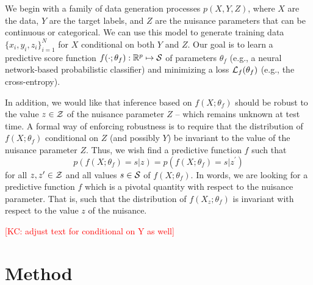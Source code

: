 \documentclass[twocolumn,superscriptaddress,aps]{revtex4-1}
\newcommand{\kcnote}[1]{\textcolor{red}{[KC: #1]}}
\theoremstyle{plain}
\begin{document}
We begin with a family of data generation processes $p(X,Y,Z)$, where $X$ are
the data, $Y$ are the target labels, and $Z$ are the nuisance parameters that
can be continuous or categorical. We can use this model to generate training
data $\{x_i, y_i, z_i\}_{i=1}^N$ for $X$ conditional on both $Y$ and $Z$. Our goal is to learn a predictive
score function $f(\cdot;\theta_f) : \mathbb{R}^p \mapsto {\cal S}$ of parameters
$\theta_f$ (e.g., a neural network-based probabilistic classifier) and
minimizing  a loss ${\cal L}_f(\theta_f)$ (e.g., the cross-entropy).

In addition, we would like that inference based on $f(X ; \theta_f)$ should be
robust to the value $z \in {\cal Z}$ of the nuisance parameter $Z$  -- which remains unknown at
test time. A formal way of enforcing robustness is to require that the distribution of
$f(X ; \theta_f)$ conditional on $Z$ (and possibly $Y$) be invariant to the value
 of the nuisance parameter $Z$. Thus, we wish find a predictive function $f$ such that
\begin{equation}\label{eqn:criterion}
    p(f(X ; \theta_f) = s | z ) = p(f(X ; \theta_f) = s | z^\prime )
\end{equation}
for all $z,z^\prime \in  {\cal Z}$ and all values $s \in {\cal S}$ of $f(X ; \theta_f)$.
In words, we are looking for a predictive function $f$
which is a pivotal quantity \citep{degroot1986probability} with respect to the
nuisance parameter. That is, such that  the distribution of $f(X_z; \theta_f)$
is invariant with respect to the value $z$ of the nuisance.

\kcnote{adjust text for conditional on Y as well}





\section{Method}
\label{sec:method}
\end{document}
